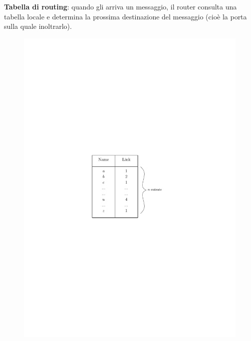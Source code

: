 \documentclass[10pt,xcolor=dvipsnames]{beamer}
\begin{document}
\begin{frame}
	\frametitle{}
	
	\textbf{Tabella di routing}: quando gli arriva un messaggio, il router consulta una tabella locale e determina
	la prossima destinazione del messaggio (cioè la porta sulla quale inoltrarlo).

	\vfill
	\begin{figure}[h]
	\centering
	\includegraphics[scale=0.8]{routing_table.pdf}
	\end{figure}
\end{frame}
\end{document}
